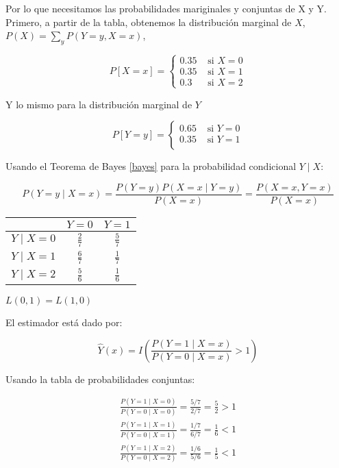 \documentclass[letter, 11pt, twoside]{report}
\begin{document}
Por lo que necesitamos las probabilidades mariginales y conjuntas de X y Y.
Primero, a partir de la tabla, obtenemos la distribución marginal de $X$, $P(X)=\sum_{y}P(Y=y,X=x)$, 


    $$
    P[X=x]=\left\{\begin{array}{cc}
    0.35 & \text { si } X=0 \\
    0.35 & \text { si } X=1 \\
    0.3 & \text { si } X=2
    \end{array}\right.
    $$

Y lo mismo para la distribución marginal de $Y$

    $$
    P[Y=y]=\left\{\begin{array}{cc}
    0.65 & \text { si }Y=0 \\
    0.35 & \text { si }Y=1 \\
    \end{array}\right.
    $$

Usando el Teorema de Bayes \ref{bayes} para la probabilidad condicional $Y \mid X$:
    
    \begin{equation}
        P(Y=y \mid X=x)=\frac{P(Y=y) P(X=x \mid Y=y)}{P(X=x)}=\frac{P(X=x, Y=x)}{P(X=x)}
        \label{bayes}
    \end{equation}
    

    \begin{tabular}{c| c c}
     & $Y=0$ & $Y=1$ \\
    \hline$Y \mid X=0$ & $\frac{2}{7}$ & $\frac{5}{7}$ \\
    \hline$Y \mid X=1$ & $\frac{6}{7}$ & $\frac{1}{7}$ \\
    \hline$Y \mid X=2$ & $\frac{5}{6}$ & $\frac{1}{6}$ \\
    \end{tabular}

    {\color{mirosa} $L(0,1)=L(1,0)$}
    
    El estimador está dado por:

    \begin{equation}
        \widehat{Y}(x)=I\left(\frac{P(Y=1 \mid X=x)}{P(Y=0 \mid X=x)}>1\right) 
    \end{equation}

    Usando la tabla de probabilidades conjuntas:
    
    $$
    \begin{gathered}
    \frac{P(Y=1 \mid X=0)}{P(Y=0 \mid X=0)}=\frac{5 / 7}{2 / 7}=\frac{5}{2}> 1\\
    \frac{P(Y=1 \mid X=1)}{P(Y=0 \mid X=1)}=\frac{1 / 7}{6 / 7}=\frac{1}{6}< 1\\
    \frac{P(Y=1 \mid X=2)}{P(Y=0 \mid X=2)}=\frac{1 / 6}{5 / 6}=\frac{1}{5}< 1
    \end{gathered}
    $$
\end{document}
